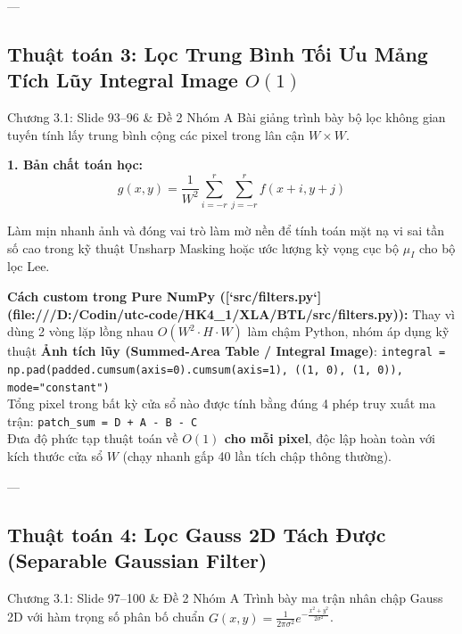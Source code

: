 \documentclass[11pt,a4paper]{article}
\begin{document}
---

\subsection{Thuật toán 3: Lọc Trung Bình Tối Ưu Mảng Tích Lũy Integral Image $O(1)$}
\begin{slidemapping}{Chương 3.1: Slide 93--96 \& Đề 2 Nhóm A}
Bài giảng trình bày bộ lọc không gian tuyến tính lấy trung bình cộng các pixel trong lân cận $W \times W$.
\end{slidemapping}

\textbf{1. Bản chất toán học:}
\begin{equation}
g(x, y) = \frac{1}{W^2} \sum_{i=-r}^r \sum_{j=-r}^r f(x+i, y+j)
\end{equation}

\begin{whyuse}
Làm mịn nhanh ảnh và đóng vai trò làm mờ nền để tính toán mặt nạ vi sai tần số cao trong kỹ thuật Unsharp Masking hoặc ước lượng kỳ vọng cục bộ $\mu_I$ cho bộ lọc Lee.
\end{whyuse}

\begin{custombox}
\textbf{Cách custom trong Pure NumPy ([`src/filters.py`](file:///D:/Codin/utc-code/HK4_1/XLA/BTL/src/filters.py)):}
Thay vì dùng 2 vòng lặp lồng nhau $O(W^2 \cdot H \cdot W)$ làm chậm Python, nhóm áp dụng kỹ thuật \textbf{Ảnh tích lũy (Summed-Area Table / Integral Image)}:
\lstinline|integral = np.pad(padded.cumsum(axis=0).cumsum(axis=1), ((1, 0), (1, 0)), mode="constant")|\\
Tổng pixel trong bất kỳ cửa sổ nào được tính bằng đúng 4 phép truy xuất ma trận:
\lstinline|patch_sum = D + A - B - C|\\
Đưa độ phức tạp thuật toán về \textbf{$O(1)$ cho mỗi pixel}, độc lập hoàn toàn với kích thước cửa sổ $W$ (chạy nhanh gấp 40 lần tích chập thông thường).
\end{custombox}

---

\subsection{Thuật toán 4: Lọc Gauss 2D Tách Được (Separable Gaussian Filter)}
\begin{slidemapping}{Chương 3.1: Slide 97--100 \& Đề 2 Nhóm A}
Trình bày ma trận nhân chập Gauss 2D với hàm trọng số phân bố chuẩn $G(x, y) = \frac{1}{2\pi\sigma^2} e^{-\frac{x^2+y^2}{2\sigma^2}}$.
\end{slidemapping}
\end{document}
